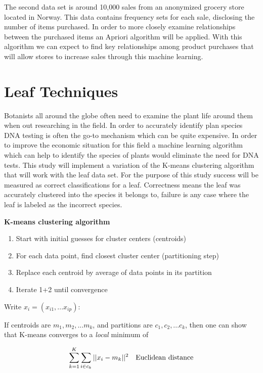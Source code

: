 \documentclass[times, 12pt,twocolumn]{article}
\begin{document}
The second data set is around 10,000 sales from an anonymized grocery store located in Norway.\cite{Art3} This data contains frequency sets for each sale,
disclosing the number of items purchased. In order to more closely examine relationships between the purchased items an Apriori algorithm will be
applied. With this algorithm we can expect to find key relationships among product purchases that will allow stores to increase sales through this
machine learning.

\section{Leaf Techniques}
Botanists all around the globe often need to examine the plant life around them when out researching in the field. In order to accurately identify plan species
DNA testing is often the go-to mechanism which can be quite expensive. In order to improve the economic situation for this field a machine learning algorithm which
can help to identify the species of plants would eliminate the need for DNA tests. This study will implement a variation of the K-means clustering algorithm that
will work with the leaf data set. For the purpose of this study success will be measured as correct classifications for a leaf. Correctness means the leaf was
accurately clustered into the species it belongs to, failure is any case where the leaf is labeled as the incorrect species.

{\bf K-means clustering algorithm}

\begin{enumerate}

\setcounter{enumi}{0}
\item Start with initial guesses for cluster centers (centroids)
\item For each data point, find closest cluster center (partitioning step)
\item Replace each centroid by average of data points in its partition
\item Iterate 1+2 until convergence

\end{enumerate}

Write $x_i = (x_{i1}, ... x_{ip})$:

If centroids are $m_1, m_2, ... m_k$, and partitions are $c_1, c_2, ... c_k$, then one can show that K-means converges to a {\it local} minimum of

\[
\sum^K_{k=1} \sum_{i\in c_k} || x_i - m_k ||^2 \ \ \ \rm Euclidean \ distance
\]
\end{document}
